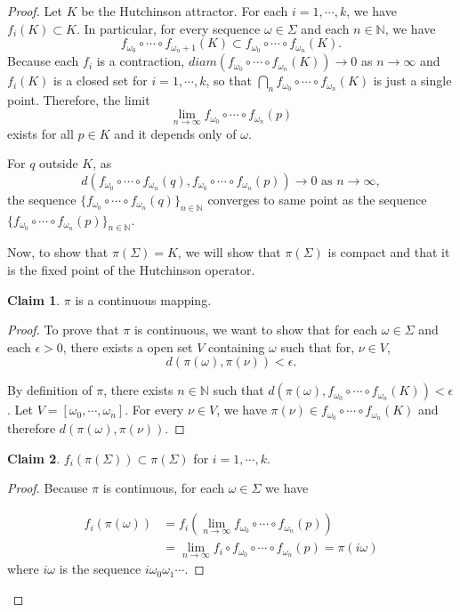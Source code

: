 \documentclass[a4paper]{article}
\theoremstyle{plain}
\theoremstyle{definition}
\newtheorem*{claim*}{Claim}
\begin{document}
\begin{proof}
Let $K$ be the Hutchinson attractor. For each $i=1, \cdots, k$, we have $f_i(K)\subset K$. In particular, for every sequence $\omega\in\Sigma$ and each $n\in\mathbb{N}$, we have
$$f_{\omega_0}\circ \cdots\circ f_{\omega_n+1}(K)\subset f_{\omega_0}\circ\cdots\circ f_{\omega_n}(K).$$
Because each $f_i$ is a contraction, $ diam(f_{\omega_0}\circ\cdots\circ f_{\omega_n}(K)) \to 0$ as $n\to\infty$ and $f_i(K)$ is a closed set for $i=1, \cdots, k$, so that $\bigcap_n f_{\omega_0}\circ\cdots\circ f_{\omega_n}(K)$ is just a single point. Therefore, the limit
$$\lim_{n\to\infty} f_{\omega_0}\circ\cdots\circ f_{\omega_n}(p)$$
exists for all $p\in K$ and it depends only of $\omega$.

For $q$ outside $K$, as 
$$d(f_{\omega_0}\circ\cdots\circ f_{\omega_n}(q), f_{\omega_0}\circ\cdots\circ f_{\omega_n}(p))\to 0\text{ as }n\to\infty,$$
the sequence $\{f_{\omega_0}\circ\cdots\circ f_{\omega_n}(q)\}_{n\in\mathbb{N}}$ converges to same point as the sequence $\{f_{\omega_0}\circ\cdots\circ f_{\omega_n}(p)\}_{n\in\mathbb{N}}$.

Now, to show that $\pi(\Sigma)=K$, we will show that $\pi(\Sigma)$ is compact and that it is the fixed point of the Hutchinson operator.

\begin{claim*} 
$\pi$ is a continuous mapping.
\end{claim*}
\begin{proof}
    To prove that $\pi$ is continuous, we want to show that for each $\omega\in\Sigma$ and each $\epsilon>0$, there exists a open set $V$ containing $\omega$ such that for, $\nu\in V$,
    $$d(\pi(\omega), \pi(\nu))<\epsilon.$$

    By definition of $\pi$, there exists $n\in\mathbb{N}$ such that $d(\pi(\omega), f_{\omega_0}\circ\cdots\circ f_{\omega_n}(K))<\epsilon$. Let $V=[\omega_0, \cdots, \omega_n]$. For every $\nu\in V$, we have $\pi(\nu)\in f_{\omega_0}\circ\cdots\circ f_{\omega_n}(K)$ and therefore $d(\pi(\omega), \pi(\nu))$.
\end{proof}

\begin{claim*}
    $f_i(\pi(\Sigma))\subset\pi(\Sigma)$ for $i=1, \cdots, k$.
\end{claim*}
\begin{proof}
    Because $\pi$ is continuous, for each $\omega\in\Sigma$ we have

    \begin{align*}
        f_i(\pi(\omega)) &= f_i(\lim_{n\to\infty} f_{\omega_0}\circ\cdots\circ f_{\omega_n}(p))\\
        &= \lim_{n\to\infty} f_i\circ f_{\omega_0}\circ\cdots\circ f_{\omega_n}(p)=\pi(i\omega)
    \end{align*}
    where $i\omega$ is the sequence $i\omega_0\omega_1\cdots$.
\end{proof}


\end{proof}
\end{document}
